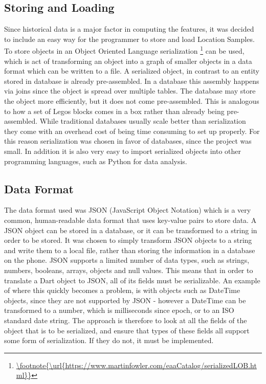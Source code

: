 \subsection{Storing and Loading}
Since historical data is a major factor in computing the features, it was decided to include an easy way for the programmer to store and load Location Samples. To store objects in an Object Oriented Language serialization \footnote{\url{\footnote{\url{https://www.martinfowler.com/eaaCatalog/serializedLOB.html}}}} can be used, which is act of transforming an object into a graph of smaller objects in a data format which can be written to a file. A serialized object, in contrast to an entity stored in database is already pre-assembled. In a database this assembly happens via joins since the object is spread over multiple tables. The database may store the object more efficiently, but it does not come pre-assembled. This is analogous to how a set of Legos blocks comes in a box rather than already being pre-assembled. While traditional databases usually scale better than serialization they come with an overhead cost of being time consuming to set up properly. For this reason serialization was chosen in favor of databases,  since the project was small. In addition it is also very easy to import serialized objects into other programming languages, such as Python for data analysis. 

\subsection{Data Format}
The data format used was JSON (JavaScript Object Notation) which is a very common, human-readable data format that uses key-value pairs to store data. A JSON object can be stored in a database, or it can be transformed to a string in order to be stored. It was chosen to simply transform JSON objects to a string and write them to a local file, rather than storing the information in a database on the phone. 
JSON supports a limited number of data types, such as strings, numbers, booleans, arrays, objects and null values. This means that in order to translate a Dart object to JSON, all of its fields must be serializable. An example of where this quickly becomes a problem, is with objects such as DateTime objects, since they are not supported by JSON - however a DateTime can be transformed to a number, which is milliseconds since epoch, or to an ISO standard date string. The approach is therefore to look at all the fields of the object that is to be serialized, and ensure that types of these fields all support some form of serialization. If they do not, it must be implemented.

